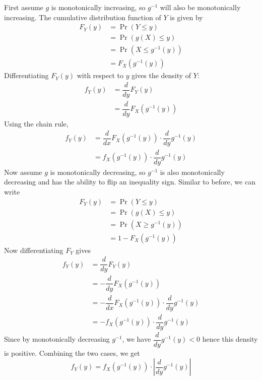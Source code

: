 \documentclass[11pt]{report} %
\begin{document}
First assume $g$ is monotonically increasing, so $g^{-1}$ will also be monotonically increasing. The cumulative distribution function of $Y$ is given by
\begin{align}
F_{Y}\left(y\right) &= \operatorname{Pr}\left(Y \leq y\right) \\
&= \operatorname{Pr}\left(g\left(X\right) \leq y\right) \\
&= \operatorname{Pr}\left(X \leq g^{-1}\left(y\right)\right) \\
&= F_{X}\left(g^{-1}\left(y\right)\right)
\end{align}
Differentiating $F_{Y}\left(y\right)$ with respect to $y$ gives the density of $Y$:
\begin{align}
f_{Y}\left(y\right) &= \dfrac{d}{dy}F_{Y}\left(y\right)\\
&= \dfrac{d}{dy}F_{X}\left(g^{-1}\left(y\right)\right)
\end{align}
Using the chain rule,
\begin{align}
f_{Y}\left(y\right) &= \dfrac{d}{dx}F_{X}\left(g^{-1}\left(y\right)\right)\cdot\dfrac{d}{dy}g^{-1}\left(y\right) \\
&= f_{X}\left(g^{-1}\left(y\right)\right)\cdot\dfrac{d}{dy}g^{-1}\left(y\right)
\end{align}
Now assume $g$ is monotonically decreasing, so $g^{-1}$ is also monotonically decreasing and has the ability to flip an inequality sign. Similar to before, we can write
\begin{align}
F_{Y}\left(y\right) &= \operatorname{Pr}\left(Y \leq y\right) \\
&= \operatorname{Pr}\left(g\left(X\right) \leq y\right) \\
&= \operatorname{Pr}\left(X \geq g^{-1}\left(y\right)\right) \\
&= 1 - F_{X}\left(g^{-1}\left(y\right)\right)
\end{align}
Now differentiating $F_{Y}$ gives 
\begin{align}
f_{Y}\left(y\right) &= \dfrac{d}{dy}F_{Y}\left(y\right) \\
&= -\dfrac{d}{dy}F_{X}\left(g^{-1}\left(y\right)\right) \\
&= -\dfrac{d}{dx}F_{X}\left(g^{-1}\left(y\right)\right)\cdot\dfrac{d}{dy}g^{-1}\left(y\right) \\
&= -f_{X}\left(g^{-1}\left(y\right)\right)\cdot\dfrac{d}{dy}g^{-1}\left(y\right)
\end{align}
Since by monotonically decreasing $g^{-1}$, we have $\dfrac{d}{dy}g^{-1}\left(y\right) < 0$ hence this density is positive. Combining the two cases, we get
\begin{equation}
f_{Y}\left(y\right) =  f_{X}\left(g^{-1}\left(y\right)\right)\cdot\left|\dfrac{d}{dy}g^{-1}\left(y\right)\right|
\end{equation}
\end{document}
